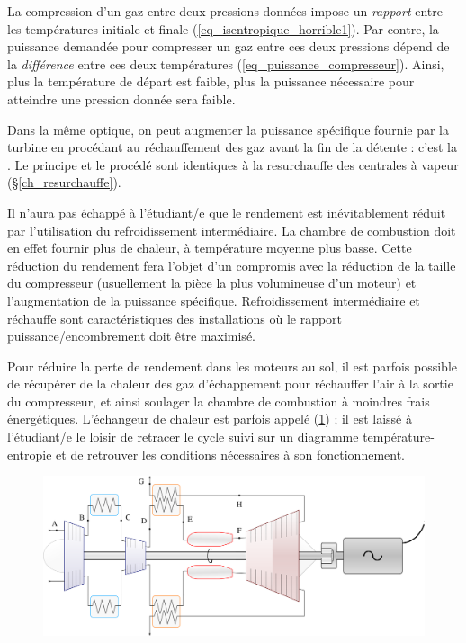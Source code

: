 		La compression d’un gaz entre deux pressions données impose un \emph{rapport} entre les températures initiale et finale (\ref{eq_isentropique_horrible1}). Par contre, la puissance demandée pour compresser un gaz entre ces deux pressions dépend de la \emph{différence} entre ces deux températures (\ref{eq_puissance_compresseur}). Ainsi, plus la température de départ est faible, plus la puissance nécessaire pour atteindre une pression donnée sera faible.

		Dans la même optique, on peut augmenter la puissance spécifique fournie par la turbine en procédant au réchauffement des gaz avant la fin de la détente : c’est la . Le principe et le procédé sont identiques à la resurchauffe des centrales à vapeur (\S\ref{ch_resurchauffe}).

		Il n’aura pas échappé à l’étudiant/e que le rendement est inévitablement réduit par l’utilisation du refroidissement intermédiaire. La chambre de combustion doit en effet fournir plus de chaleur, à température moyenne plus basse. Cette réduction du rendement fera l’objet d’un compromis avec la réduction de la taille du compresseur (usuellement la pièce la plus volumineuse d’un moteur) et l’augmentation de la puissance spécifique. Refroidissement intermédiaire et réchauffe sont caractéristiques des installations où le rapport puissance/encombrement doit être maximisé.

		Pour réduire la perte de rendement dans les moteurs au sol, il est parfois possible de récupérer de la chaleur des gaz d’échappement pour réchauffer l’air à la sortie du compresseur, et ainsi soulager la chambre de combustion à moindres frais énergétiques. L’échangeur de chaleur est parfois appelé  (\cref{fig_intercooler_echangeur}) ; il est laissé à l’étudiant/e le loisir de retracer le cycle suivi sur un diagramme température-entropie et de retrouver les conditions nécessaires à son fonctionnement.
		
		\begin{figure}
			\begin{center}
				\includegraphics[scale=0.6]{images/circuit_intercooler_echangeur.png}
			\end{center}
			\label{fig_intercooler_echangeur}
		\end{figure}

